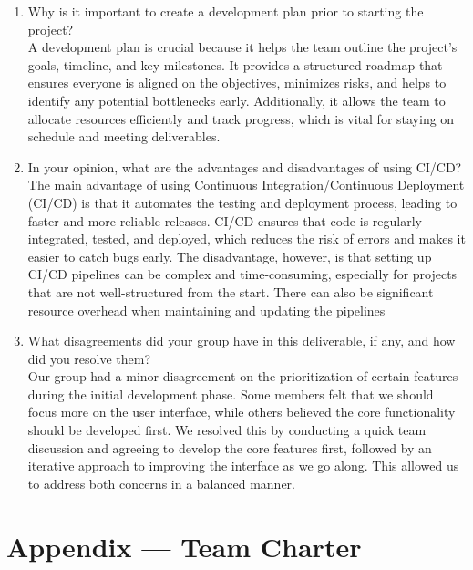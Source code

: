 \documentclass{article}
\begin{document}
\begin{enumerate}
    \item Why is it important to create a development plan prior to starting the
    project?\\
    A development plan is crucial because it helps the team outline the project's
    goals, timeline, and key milestones. It provides a structured roadmap that
    ensures everyone is aligned on the objectives, minimizes risks, and helps
    to identify any potential bottlenecks early. Additionally, it allows the team
    to allocate resources efficiently and track progress, which is vital for staying
    on schedule and meeting deliverables.

    \item In your opinion, what are the advantages and disadvantages of using
    CI/CD?\\
    The main advantage of using Continuous Integration/Continuous Deployment (CI/CD)
    is that it automates the testing and deployment process, leading to faster and 
    more reliable releases. CI/CD ensures that code is regularly integrated, tested,
    and deployed, which reduces the risk of errors and makes it easier to catch bugs early. 
    The disadvantage, however, is that setting up CI/CD pipelines can be complex and 
    time-consuming, especially for projects that are not well-structured from the start. 
    There can also be significant resource overhead when maintaining and updating the pipelines

    \item What disagreements did your group have in this deliverable, if any,
    and how did you resolve them?\\
    Our group had a minor disagreement on the prioritization of certain features during 
    the initial development phase. Some members felt that we should focus more on the 
    user interface, while others believed the core functionality should be developed first.
    We resolved this by conducting a quick team discussion and agreeing to develop the core
    features first, followed by an iterative approach to improving the interface as we go along.
     This allowed us to address both concerns in a balanced manner.
\end{enumerate}

\newpage{}

\section*{Appendix --- Team Charter}
\end{document}
